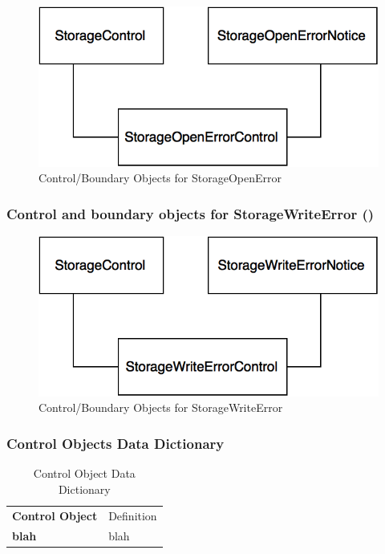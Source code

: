 \documentclass[12pt,letterpaper]{article}
\begin{document}
\begin{figure}[H]
	\centering{}
	\includegraphics[scale=0.4]{imgs/cbod/storage-open-error.png}
	\caption{Control/Boundary Objects for StorageOpenError}
\end{figure}

\subsubsection*{Control and boundary objects for StorageWriteError (\storagewriteerror{})}

\begin{figure}[H]
	\centering{}
	\includegraphics[scale=0.4]{imgs/cbod/storage-write-error.png}
	\caption{Control/Boundary Objects for StorageWriteError}
\end{figure}


\subsubsection*{Control Objects Data Dictionary}

\begin{table}[H]
\caption{Control Object Data Dictionary}
	\begin{tabu} to 
		\tableheader{}Control Object & Definition\\
		blah & blah\\
		
	\end{tabu}
\end{table}
\end{document}
